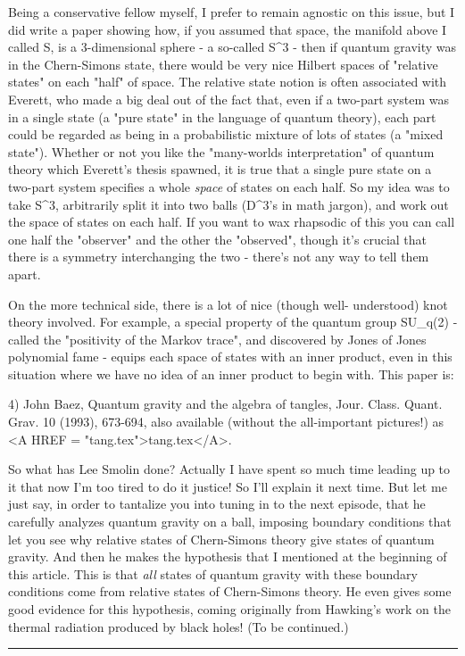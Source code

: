 Being a conservative fellow myself, I prefer to remain agnostic
on this issue, but I did write a paper showing how, if you assumed 
that space, the manifold above I called S, is a 3-dimensional sphere -
a so-called S^3 - then if quantum gravity was in the Chern-Simons
state, there would be very nice Hilbert spaces of "relative states" on
each "half" of space.  The relative state notion is often associated
with Everett, who made a big deal out of the fact that, even if
a two-part system was in a single state (a "pure state" in the language
of quantum theory), each part could be regarded as being in a probabilistic
mixture of lots of states (a "mixed state").  Whether or not you like
the "many-worlds interpretation" of quantum theory which Everett's thesis 
spawned, it is true that a single pure state on a two-part system specifies
a whole \emph{space} of states on each half.  So my idea was to take S^3,
arbitrarily split it into two balls (D^3's in math jargon), and work out
the space of states on each half.  If you want to wax rhapsodic of this
you can call one half the "observer" and the other the "observed", though
it's crucial that there is a symmetry interchanging the two - there's
not any way to tell them apart.  

On the more technical side, there is a lot of nice (though well-
understood) knot theory involved.  For example, a special property of
the quantum group SU_q(2) - called the "positivity of the Markov trace", 
and discovered by Jones of Jones polynomial fame - equips each 
space of states with an inner product, even in this situation where 
we have no idea of an inner product to begin with.  This paper is:

4) John Baez, Quantum gravity and the algebra of tangles, Jour. Class.
Quant. Grav. 10 (1993), 673-694, also available (without 
the all-important pictures!) as <A HREF = "tang.tex">tang.tex</A>.

So what has Lee Smolin done?  Actually I have spent so much time
leading up to it that now I'm too tired to do it justice!  So I'll explain
it next time.  But let me just say, in order to tantalize you into tuning
in to the next episode, that he carefully analyzes quantum gravity on
a ball, imposing boundary conditions that let you see why relative
states of Chern-Simons theory give states of quantum gravity.  And
then he makes the hypothesis that I mentioned at the beginning
of this article.  This is that \emph{all} states of quantum gravity
with these boundary conditions come from relative states of
Chern-Simons theory.  He even gives some good evidence for this
hypothesis, coming originally from Hawking's work on the thermal
radiation produced by black holes!  (To be continued.)
\par\noindent\rule{\textwidth}{0.4pt}

